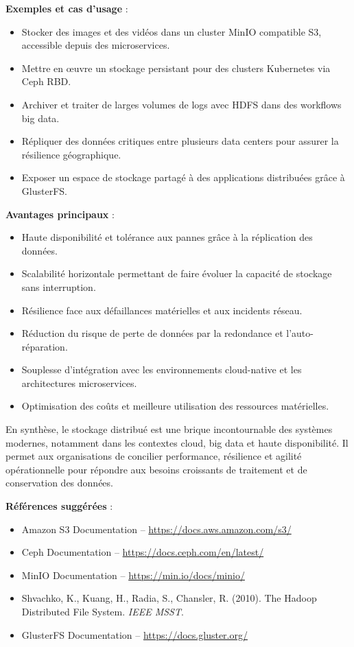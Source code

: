 \textbf{Exemples et cas d’usage} :
\begin{itemize}
	\item Stocker des images et des vidéos dans un cluster MinIO compatible S3, accessible depuis des microservices.
	\item Mettre en œuvre un stockage persistant pour des clusters Kubernetes via Ceph RBD.
	\item Archiver et traiter de larges volumes de logs avec HDFS dans des workflows big data.
	\item Répliquer des données critiques entre plusieurs data centers pour assurer la résilience géographique.
	\item Exposer un espace de stockage partagé à des applications distribuées grâce à GlusterFS.
\end{itemize}

\textbf{Avantages principaux} :
\begin{itemize}
	\item Haute disponibilité et tolérance aux pannes grâce à la réplication des données.
	\item Scalabilité horizontale permettant de faire évoluer la capacité de stockage sans interruption.
	\item Résilience face aux défaillances matérielles et aux incidents réseau.
	\item Réduction du risque de perte de données par la redondance et l’auto-réparation.
	\item Souplesse d’intégration avec les environnements cloud-native et les architectures microservices.
	\item Optimisation des coûts et meilleure utilisation des ressources matérielles.
\end{itemize}

En synthèse, le stockage distribué est une brique incontournable des systèmes modernes, notamment dans les contextes cloud, big data et haute disponibilité. Il permet aux organisations de concilier performance, résilience et agilité opérationnelle pour répondre aux besoins croissants de traitement et de conservation des données.

\textbf{Références suggérées} :
\begin{itemize}
	\item Amazon S3 Documentation – \url{https://docs.aws.amazon.com/s3/}
	\item Ceph Documentation – \url{https://docs.ceph.com/en/latest/}
	\item MinIO Documentation – \url{https://min.io/docs/minio/}
	\item Shvachko, K., Kuang, H., Radia, S., Chansler, R. (2010). The Hadoop Distributed File System. \textit{IEEE MSST}.
	\item GlusterFS Documentation – \url{https://docs.gluster.org/}
\end{itemize}

